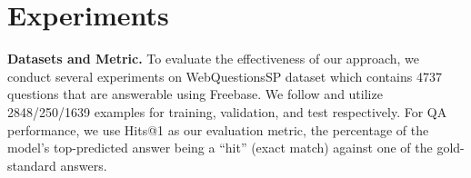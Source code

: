 \documentclass[sigconf,natbib=true,anonymous=False]{acmart}
\begin{document}
\begin{table}[!tbp]
\centering
\caption{Experimental results on WebQSP dataset. “w/o" denotes the model performance without a specific module. * denotes the reproduced result.}
    
  \label{tab:main}\vspace{-0.6cm}
\end{table}

\section{Experiments}
\textbf{Datasets and Metric.} To evaluate the effectiveness of our approach, we conduct several experiments on WebQuestionsSP \cite{yih2016value} dataset which contains 4737 questions that are answerable using Freebase. We follow \citeauthor{sun2018open} and utilize 2848/250/1639 examples for training, validation, and test respectively. 
For QA performance, we use Hits@1 as our evaluation metric, the percentage of the model’s top-predicted answer being a “hit” (exact match) against one of the gold-standard answers.
\end{document}
